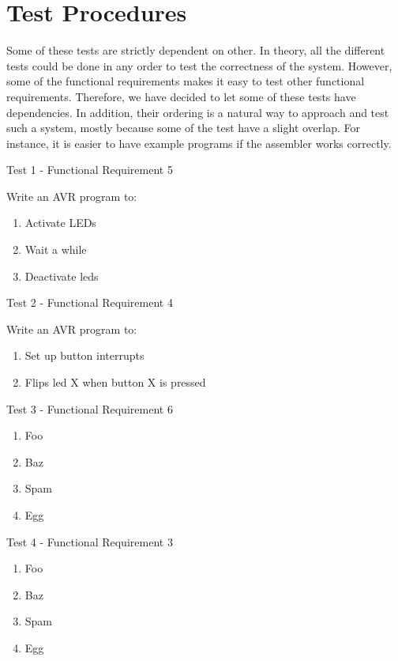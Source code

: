 \section{Test Procedures}

Some of these tests are strictly dependent on other. In theory, all the
different tests could be done in any order to test the correctness of the
system. However, some of the functional requirements makes it easy to test other
functional requirements. Therefore, we have decided to let some of these tests
have dependencies. In addition, their ordering is a natural way to approach and
test such a system, mostly because some of the test have a slight overlap. For
instance, it is easier to have example programs if the assembler works
correctly.

{\sc Test 1 - Functional Requirement 5}

{\em \FRV}
Write an AVR program to:
\begin{enumerate}
\item Activate LEDs
\item Wait a while
\item Deactivate leds
\end{enumerate}

{\sc Test 2 - Functional Requirement 4}

{\em \FRIV}
Write an AVR program to:
\begin{enumerate}
\item Set up button interrupts
\item Flips led X when button X is pressed
\end{enumerate}

{\sc Test 3 - Functional Requirement 6}

{\em \FRVI}

\begin{enumerate}
\item Foo
\item Baz
\item Spam
\item Egg
\end{enumerate}

{\sc Test 4 - Functional Requirement 3}

{\em \FRIII}

\begin{enumerate}
\item Foo
\item Baz
\item Spam
\item Egg
\end{enumerate}

